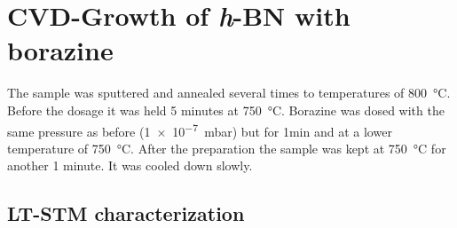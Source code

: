 \section{CVD-Growth of \textit{h}-BN with borazine}
The sample was sputtered and annealed several times to temperatures of \SI{800}{\celsius}. Before the dosage it was held 5 minutes at \SI{750}{\celsius}. Borazine was dosed with the same pressure as before (\SI{1e-7}{\milli \bar}) but for 1min and at a lower temperature of \SI{750}{\celsius}. After the preparation the sample was kept at \SI{750}{\celsius} for another 1 minute. It was cooled down slowly.
	 \subsection{LT-STM characterization}

	
